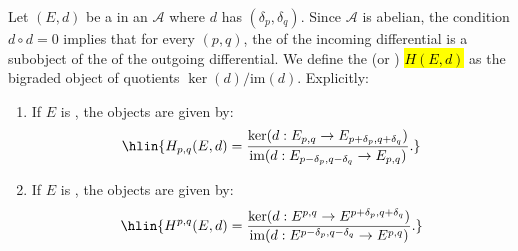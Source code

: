 \begin{definition} \label{definition:homology_and_cohomology_of_a_differential_bigraded_object_in_an_abelian_category}
    Let $(E,d)$ be a  in an  $\mathcal{A}$ where $d$ has  $(\delta_p, \delta_q)$.
    Since $\mathcal{A}$ is abelian, the condition $d \circ d = 0$ implies that for every $(p,q)$, the  of the incoming differential is a subobject of the  of the outgoing differential. We define the  (or ) \hl{$H(E, d)$} as the bigraded object of quotients $\ker(d)/\text{im}(d)$. Explicitly:

    \begin{enumerate}
        \item If $E$ is , the objects are given by:
        $$\hlin{H_{p,q}(E, d) = \frac{\ker(d: E_{p,q} \to E_{p+\delta_p, q+\delta_q})}{\text{im}(d: E_{p-\delta_p, q-\delta_q} \to E_{p,q})}.}$$
        
        \item If $E$ is , the objects are given by:
        $$\hlin{H^{p,q}(E, d) = \frac{\ker(d: E^{p,q} \to E^{p+\delta_p, q+\delta_q})}{\text{im}(d: E^{p-\delta_p, q-\delta_q} \to E^{p,q})}.}$$
    \end{enumerate}
\end{definition}


